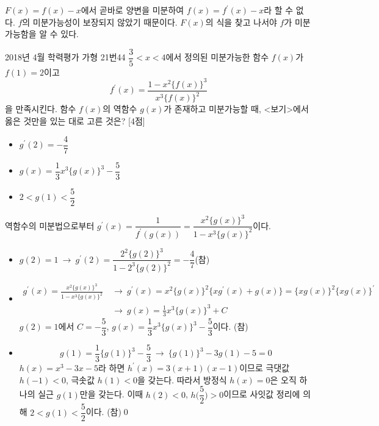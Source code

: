 \documentclass{article}
\begin{document}
\begin{remark}
	$F(x)=f(x)-x$에서 곧바로 양변을 미분하여 $f(x)=f^{\prime}(x)-x$라 할 수 없다. $f$의 미분가능성이 보장되지 않았기 때문이다. $F(x)$의 식을 찾고 나서야 $f$가 미분가능함을 알 수 있다.
\end{remark}

\newpage
\begin{prob}{2018년 4월 학력평가 가형 21번}{44}
	$\dfrac{3}{5}<x<4$에서 정의된 미분가능한 함수 $f(x)$가 $f(1)=2$이고
	\[
		f^{\prime}(x)=\frac{1-x^2\{f(x)\}^3}{x^3\{f(x)\}^2}
	\]
	을 만족시킨다. 함수 $f(x)$의 역함수 $g(x)$가 존재하고 미분가능할 때, <보기>에서 옳은 것만을 있는 대로 고른 것은? [4점]
	\begin{hint}[보기]
		\begin{itemize}
			\item[ㄱ.] $g^{\prime}(2)=-\dfrac{4}{7}$
			\item[ㄴ.] $g(x)=\dfrac{1}{3}x^3\{g(x)\}^3-\dfrac{5}{3}$
			\item[ㄷ.] $2<g(1)<\dfrac{5}{2}$
		\end{itemize}
	\end{hint}
\end{prob}

\begin{sol}[풀이 1]
	역함수의 미분법으로부터 $g^{\prime}(x)=\dfrac{1}{f^{\prime}(g(x))}=\dfrac{x^2\{g(x)\}^3}{1-x^3\{g(x)\}^2}$이다.
	\begin{itemize}
		\item[ㄱ.] $g(2)=1~\longrightarrow~g^{\prime}(2)=\dfrac{2^2\{g(2)\}^3}{1-2^3\{g(2)\}^2}=-\dfrac{4}{7}$\quad(참)
		\item[ㄴ.] \[
				\begin{aligned}
					g^{\prime}(x)=\frac{x^2\{g(x)\}^3}{1-x^3\{g(x)\}^2}~&\longrightarrow~g^{\prime}(x)=x^2\{g(x)\}^2\{xg^{\prime}(x)+g(x)\}=\{xg(x)\}^2\{xg(x)\}^{\prime}\\[3pt]
					&\longrightarrow~g(x)=\frac{1}{3}x^3\{g(x)\}^3+C
				\end{aligned}
			\]
		    $g(2)=1$에서 $C=-\dfrac{5}{3}$, $g(x)=\dfrac{1}{3}x^3\{g(x)\}^3-\dfrac{5}{3}$이다. (참)
		\item[ㄷ.] \[
				g(1)=\frac{1}{3}\{g(1)\}^3-\frac{5}{3}~\longrightarrow~\{g(1)\}^3-3g(1)-5=0
			\]
			$h(x)=x^3-3x-5$라 하면 $h^{\prime}(x)=3(x+1)(x-1)$이므로 극댓값 $h(-1)<0$, 극솟값 $h(1)<0$을 갖는다. 따라서 방정식 $h(x)=0$은 오직 하나의 실근 $g(1)$만을 갖는다. 이때 $h(2)<0$, $h\biggl(\dfrac{5}{2}\biggr)>0$이므로 사잇값 정리에 의해 $2<g(1)<\dfrac{5}{2}$이다. (참)\qed
	\end{itemize}
\end{sol}
\end{document}
